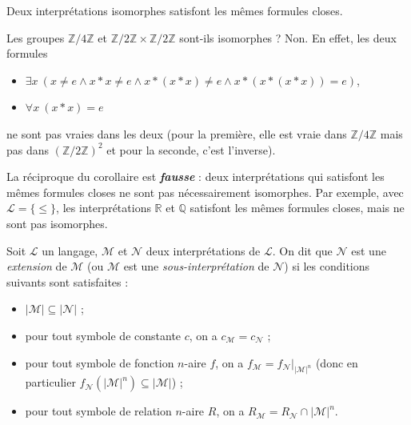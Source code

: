 \documentclass[./main]{subfiles}
\begin{document}
  \begin{crlr}
    Deux interprétations isomorphes satisfont les mêmes formules closes.
  \end{crlr}

  \begin{exo}
    Les groupes $\mathds{Z} / 4 \mathds{Z}$ et $\mathds{Z} / 2 \mathds{Z} \times \mathds{Z} / 2 \mathds{Z}$ sont-ils isomorphes ?
    Non. En effet, les deux formules 
    \begin{itemize}
      \item $\exists x\: (x \neq e \land x * x \neq e \land x * (x * x) \neq e \land x * (x * (x * x)) = e)$,
      \item $\forall x \: (x*x) = e$
    \end{itemize}
    ne sont pas vraies dans les deux (pour la première, elle est vraie dans $\mathds{Z} / 4 \mathds{Z}$ mais pas dans $(\mathds{Z} / 2 \mathds{Z})^2$ et pour la seconde, c'est l'inverse).
  \end{exo}

  \begin{rmk}
    La réciproque du corollaire est \textit{\textbf{fausse}} : deux interprétations qui satisfont les mêmes formules closes ne sont pas nécessairement isomorphes.
    Par exemple, avec $\mathcal{L} = \{{\le}\}$, les interprétations $\mathds{R}$ et $\mathds{Q}$ satisfont les mêmes formules closes, mais ne sont pas isomorphes.
  \end{rmk}

  \begin{defn}
    Soit $\mathcal{L}$ un langage, $\mathcal{M}$ et $\mathcal{N}$ deux interprétations de $\mathcal{L}$.
    On dit que $\mathcal{N}$ est une \textit{extension} de $\mathcal{M}$ (ou $\mathcal{M}$ est une \textit{sous-interprétation} de $\mathcal{N}$) si les conditions suivants sont satisfaites :
    \begin{itemize}
      \item $|\mathcal{M}| \subseteq |\mathcal{N}|$ ;
      \item pour tout symbole de constante $c$, on a $c_{\mathcal{M}} = c_{\mathcal{N}}$ ;
      \item pour tout symbole de fonction $n$-aire $f$, on a $f_{\mathcal{M}} = f_{\mathcal{N}}\big|_{|\mathcal{M}|^n}$ (donc en particulier $f_{\mathcal{N}}(|\mathcal{M}|^n) \subseteq |\mathcal{M}|$) ;
      \item pour tout symbole de relation $n$-aire $R$, on a $R_{\mathcal{M}} = R_{\mathcal{N}} \cap |\mathcal{M}|^n$.
    \end{itemize}
  \end{defn}
\end{document}
